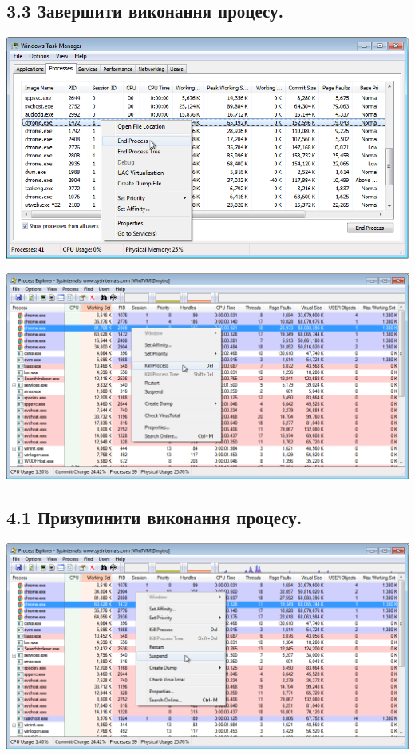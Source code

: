 \documentclass{article}
\begin{document}
\begin{normalsize}
	\subsection*{3.3 Завершити виконання процесу.}
	\begin{center}
		\includegraphics[scale=0.6]{end1}
	\end{center}

	\begin{center}
		\includegraphics[scale=0.49]{end2}
	\end{center}

	\subsection*{4.1 Призупинити виконання процесу.}
	\begin{center}
		\includegraphics[scale=0.49]{suspend1}
	\end{center}


\end{normalsize}
\end{document}
